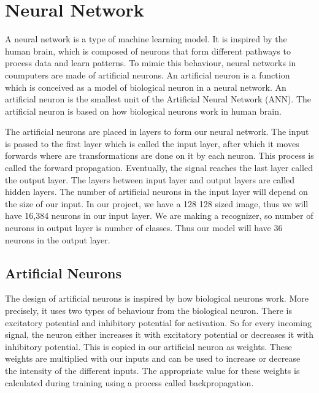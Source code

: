 \documentclass[a4paper,oneside,12pt]{report}
\begin{document}
\chapter{Neural Network}
\label{sec:orgb8eea2f}
A neural network is a type of machine learning model. It is inspired by the human brain, which is composed of neurons that form different pathways to process data and learn patterns. To mimic this behaviour, neural networks in coumputers are made of artificial neurons. An artificial neuron is a function which is conceived as a model of biological neuron in a neural network. An artificial neuron is the smallest unit of the Artificial Neural Network (ANN). The artificial neuron is based on how biological neurons work in human brain.

The artificial neurons are placed in layers to form our neural network. The input is passed to the first layer which is called the input layer, after which it moves forwards where are transformations are done on it by each neuron. This process is called the forward propagation. Eventually, the signal reaches the last layer called the output layer. The layers between input layer and output layers are called hidden layers. The number of artificial neurons in the input layer will depend on the size of our input. In our project, we have a 128 \texttimes{} 128 sized image, thus we will have 16,384 neurons in our input layer. We are making a recognizer, so number of neurons in output layer is number of classes. Thus our model will have 36 neurons in the output layer.

\section{Artificial Neurons}
\label{sec:org3fbc4aa}
The design of  artificial neurons is inspired by how biological neurons work. More precisely, it uses two types of behaviour from the biological neuron. There is excitatory potential and inhibitory potential for activation. So for every incoming signal, the neuron either increases it with excitatory potential or decreases it with inhibitory potential. This is copied in our artificial neuron as weights. These weights are multiplied with our inputs and can be used to increase or decrease the intensity of the different inputs. The appropriate value for these weights is calculated during training using a process called backpropagation.
\end{document}

